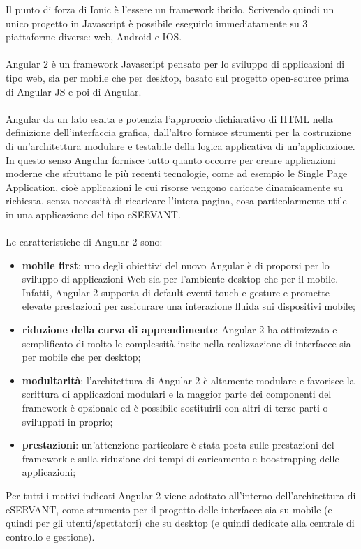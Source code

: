 Il punto di forza di Ionic è l’essere un framework ibrido. Scrivendo quindi un unico progetto in Javascript è possibile eseguirlo immediatamente su 3 piattaforme diverse: web, Android e IOS.
\paragraph{}

Angular 2 è un framework Javascript pensato per lo sviluppo di applicazioni di tipo web, sia per mobile che per desktop, basato sul progetto open-source prima di Angular JS e poi di Angular.
\paragraph{}

Angular da un lato esalta e potenzia l’approccio dichiarativo di HTML nella definizione
dell’interfaccia grafica, dall’altro fornisce strumenti per la costruzione di un’architettura modulare e testabile della logica applicativa di un’applicazione.
In questo senso Angular fornisce tutto quanto occorre per creare applicazioni moderne che
sfruttano le più recenti tecnologie, come ad esempio le Single Page Application, cioè
applicazioni le cui risorse vengono caricate dinamicamente su richiesta, senza necessità di
ricaricare l’intera pagina, cosa particolarmente utile in una applicazione del tipo eSERVANT.
\paragraph{}

Le caratteristiche di Angular 2 sono:

\begin{itemize}
    \item  \textbf{mobile first}: uno degli obiettivi del nuovo Angular è di proporsi per lo
    sviluppo di applicazioni Web sia per l’ambiente desktop che per il mobile.
    Infatti, Angular 2 supporta di default eventi touch e gesture e promette
    elevate prestazioni per assicurare una interazione fluida sui dispositivi
    mobile;
    \item \textbf{riduzione della curva di apprendimento}: Angular 2 ha ottimizzato e
    semplificato di molto le complessità insite nella realizzazione di interfacce
    sia per mobile che per desktop;
    \item \textbf{modultarità}: l’architettura di Angular 2 è altamente modulare e favorisce la
    scrittura di applicazioni modulari e la maggior parte dei componenti del
    framework è opzionale ed è possibile sostituirli con altri di terze parti o
    sviluppati in proprio;
    \item \textbf{prestazioni}: un’attenzione particolare è stata posta sulle prestazioni del
    framework e sulla riduzione dei tempi di caricamento e boostrapping delle
    applicazioni;
\end{itemize}

Per tutti i motivi indicati Angular 2 viene adottato all’interno dell’architettura di
eSERVANT, come strumento per il progetto delle interfacce sia su mobile (e quindi per
gli utenti/spettatori) che su desktop (e quindi dedicate alla centrale di controllo e
gestione).
